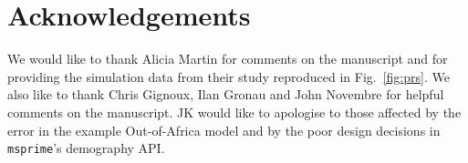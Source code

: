 \documentclass{article}
\newcommand{\msprime}[0]{\texttt{msprime}}
\newcommand{\aprcomment}[1]{{\textcolor{blue}{APR: #1}}}
\begin{document}
\section*{Acknowledgements}
We would like to thank Alicia Martin for comments on the manuscript
and for providing the simulation data from their study reproduced
in Fig.~\ref{fig:prs}. We also like to thank
Chris Gignoux, Ilan Gronau and John Novembre for helpful comments on the manuscript.
JK would like to apologise
to those affected by the error in the example Out-of-Africa model and
by the poor design decisions in \msprime's demography API.

\end{document}
